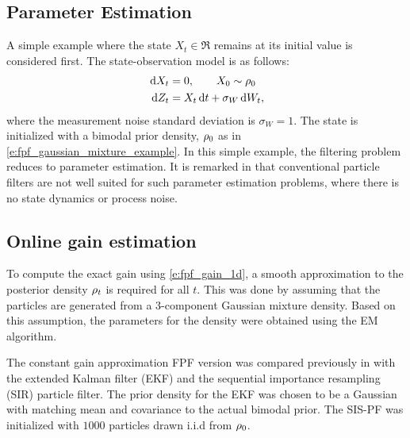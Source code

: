 \subsection{Parameter Estimation }
\label{s:param_estimation} %
A simple example where the state $X_t \in \Re$ remains at its initial value is considered first.
The state-observation model is as follows:
\[
\begin{aligned}
\,\textmd{d} X_t&=0, \qquad X_0 \sim \rho_0\\
\,\textmd{d} Z_t&= X_t \,\textmd{d} t+\sigma_{W}\,\textmd{d} W_t,
\end{aligned}
\]
where the measurement noise standard deviation is $\sigma_{W} = 1$. The state is initialized with a bimodal prior density, $\rho_0$ as in \eqref{e:fpf_gaussian_mixture_example}. 
In this simple example, the filtering problem reduces to parameter estimation. It is remarked in \cite{arumasgorcla02} that conventional particle filters are not well suited for such parameter estimation problems, where there is no state dynamics or process noise.
%
\subsection*{Online gain estimation}
To compute the exact gain using \eqref{e:fpf_gain_1d}, a smooth approximation to the posterior density $\rho_t$ is required for all $t$. This was done by assuming that the particles are generated from a  3-component Gaussian mixture density. Based on this assumption, the parameters for the density were obtained using the EM algorithm.

The constant gain approximation FPF  version was compared previously in \cite{tilghiomeh13} with the extended Kalman filter (EKF) and the  sequential importance resampling (SIR) particle filter. The prior density for the EKF was chosen to be a Gaussian with matching mean and covariance to the actual bimodal prior. The SIS-PF was   initialized with $1000$ particles drawn i.i.d from $\rho_0$.

